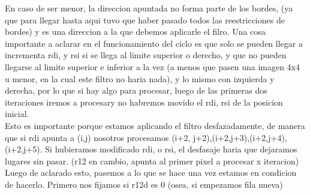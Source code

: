 \documentclass[a4paper]{article}
\begin{document}
	En caso de ser menor, la direccion apuntada no forma parte de los bordes, (ya que para llegar hasta aqui tuvo que haber pasado todos las reestricciones de bordes) y es una direccion a la que debemos aplicarle el filro. \hfill \break
	Una cosa importante a aclarar en el funcionamiento del ciclo es que solo se pueden llegar a incrementa rdi, y rsi si se llega al limite superior o derecho, y que no pueden llegarse al limite superior e inferior a la vez (a menos que pasen una imagen 4x4 u menor, en la cual este filtro no haria nada), y lo mismo con izquierda y derecha,  por lo que si hay algo para procesar, luego de las primeras dos iteraciones iremos a procesary no habremos movido el rdi, rsi de la posicion inicial. \\
	Esto es importante porque estamos aplicando el filtro desfazadamente, de manera que si rdi apunta a (i,j) nosotros procesamos  {(i+2, j+2),(i+2,j+3),(i+2,j+4),(i+2,j+5)}. Si hubieramos modificado rdi, o rsi, el desfasaje haria que dejaramos lugares sin pasar. (r12 en cambio, apunta al primer pixel a procesar x iteracion) 
	\hfill \break	
	\\
	Luego de aclarado esto, pasemos a lo que se hace una vez estamos en condicion de hacerlo. Primero nos fijamos si r12d es 0 (osea, si empezamos fila nueva)
	\hfill \break
	 
\end{document}
